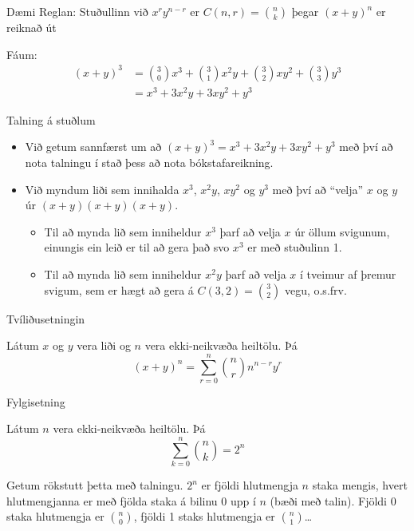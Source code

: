 \documentclass{beamer}
\begin{document}
\begin{frame}{Dæmi}
Reglan: Stuðullinn við $x^ry^{n-r}$ er $C(n,r) = \binom{n}{k}$ þegar $(x + y)^n$ er reiknað út

Fáum:
\begin{align*}
(x+y)^3 &= \binom{3}{0} x^3 + \binom{3}{1}x^2y + \binom{3}{2}xy^2 + \binom{3}{3}y^3\\
&= x^3 + 3x^2y + 3xy^2 + y^3
\end{align*}

\end{frame}

\begin{frame}{Talning á stuðlum}
\begin{itemize}
 \item Við getum sannfærst um að $(x+y)^3 = x^3 + 3x^2y + 3xy^2 + y^3$ með því að nota talningu í stað þess að nota bókstafareikning.
 \item Við myndum liði sem innihalda $x^3$, $x^2y$, $xy^2$ og $y^3$ með því að ``velja'' $x$ og $y$ úr $(x+y)(x+y)(x+y)$.
 \begin{itemize}
  \item Til að mynda lið sem inniheldur $x^3$ þarf að velja $x$ úr öllum svigunum, einungis ein leið er til að gera það svo $x^3$ er með stuðulinn 1. 
  \item Til að mynda lið sem inniheldur $x^2y$ þarf að velja $x$ í tveimur af þremur svigum, sem er hægt að gera á $C(3,2) = \binom{3}{2}$ vegu, o.s.frv.
 \end{itemize}
\end{itemize}
\end{frame}

\begin{frame}{Tvíliðusetningin}
\begin{tcolorbox}[title=Tvíliðusetningin]
Látum $x$ og $y$ vera liði og $n$ vera ekki-neikvæða heiltölu. Þá
\[
 (x + y)^n = \sum_{r=0}^n \binom{n}{r} n^{n-r} y^r
\]
\end{tcolorbox}
\end{frame}

\begin{frame}{Fylgisetning}
\begin{tcolorbox}[title=Fylgisetning tvíliðusetningarinnar]
Látum $n$ vera ekki-neikvæða heiltölu. Þá
\[
 \sum_{k=0}^n \binom{n}{k} = 2^n
\]
\end{tcolorbox}
Getum rökstutt þetta með talningu. $2^n$ er fjöldi hlutmengja $n$ staka mengis, hvert hlutmengjanna er með fjölda staka á bilinu $0$ upp í $n$ (bæði með talin). Fjöldi 0 staka hlutmengja er $\binom{n}{0}$, fjöldi 1 staks hlutmengja er $\binom{n}{1}$\ldots
\end{frame}
\end{document}
